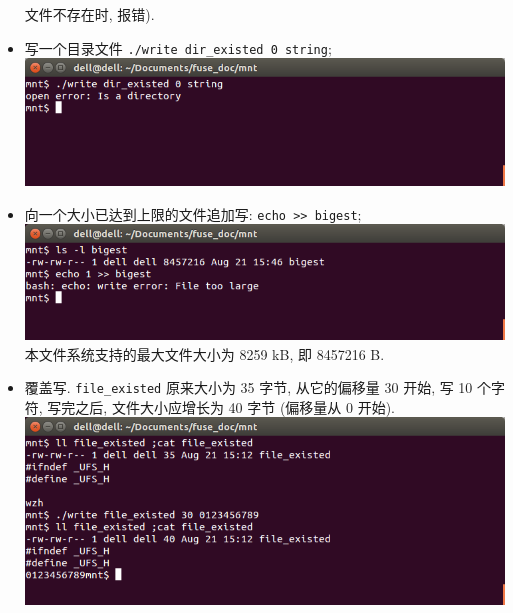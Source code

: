\documentclass[nofonts, titlepage]{ctexart}
\begin{document}
\begin{itemize}
  文件不存在时, 报错).
\item
    写一个目录文件 \texttt{./write dir\_existed 0 string};\\
  \includegraphics[width=14cm]{./images/./write_t3.png}
\item
    向一个大小已达到上限的文件追加写:
  \texttt{echo >> bigest};\\
  \includegraphics[width=14cm]{./images/./write_t4.png} \\ 
  本文件系统支持的最大文件大小为 8259 kB, 即 8457216 B.
\item 覆盖写. \verb'file_existed' 原来大小为 35 字节, 从它的偏移量 30 开始,
    写 10 个字符, 写完之后, 文件大小应增长为 40 字节 (偏移量从 0 开始). \\
    \includegraphics[width=14cm]{./images/write_t5.png}
\end{itemize}
\end{document}
